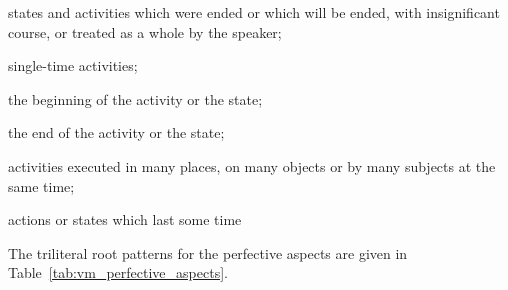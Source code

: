 \documentclass[grammar]{subfiles}
\begin{document}
  \begin{itemize*}
  \item states and activities which were ended or which will be ended, with insignificant course, or treated as a whole by the speaker;
  \item single-time activities;
  \item the beginning of the activity or the state;
  \item the end of the activity or the state;
  \item activities executed in many places, on many objects or by many subjects at the same time;
  \item actions or states which last some time
  \end{itemize*}

  The triliteral root patterns for the perfective aspects are given in Table~\ref{tab:vm_perfective_aspects}.
\end{document}
